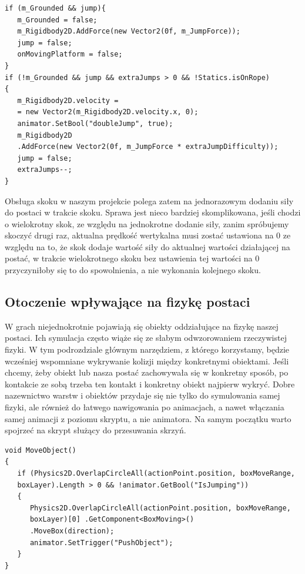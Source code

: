 \documentclass[oneside,polski,logo]{amuthesis}
\begin{document}
\begin{lstlisting}[breaklines=true,
language={[Sharp]C},
rulecolor=\color{blue!80!black},
caption={Fragment klasy \texttt{CharacterController.cs}}
]
if (m_Grounded && jump){
   m_Grounded = false;
   m_Rigidbody2D.AddForce(new Vector2(0f, m_JumpForce));
   jump = false;
   onMovingPlatform = false;
}
if (!m_Grounded && jump && extraJumps > 0 && !Statics.isOnRope)
{
   m_Rigidbody2D.velocity =
   = new Vector2(m_Rigidbody2D.velocity.x, 0);
   animator.SetBool("doubleJump", true);
   m_Rigidbody2D
   .AddForce(new Vector2(0f, m_JumpForce * extraJumpDifficulty));
   jump = false;
   extraJumps--;
}
\end{lstlisting}
\newpage
Obsługa skoku w naszym projekcie polega zatem na jednorazowym dodaniu siły do postaci w trakcie skoku. Sprawa jest nieco bardziej skomplikowana, jeśli chodzi o wielokrotny skok, ze względu na jednokrotne dodanie siły, zanim spróbujemy skoczyć drugi raz, aktualna prędkość wertykalna musi zostać ustawiona na 0 ze względu na to, że skok dodaje wartość siły do aktualnej wartości działającej na postać, w trakcie wielokrotnego skoku bez ustawienia tej wartości na 0 przyczyniłoby się to do spowolnienia, a nie wykonania kolejnego skoku.

\subsection{Otoczenie wpływające na fizykę postaci}
W grach niejednokrotnie pojawiają się obiekty oddziałujące na fizykę naszej postaci. Ich symulacja często wiąże się ze słabym odwzorowaniem rzeczywistej fizyki. W tym podrozdziale głównym narzędziem, z którego korzystamy, będzie wcześniej wspomniane wykrywanie kolizji między konkretnymi obiektami. Jeśli chcemy, żeby obiekt lub nasza postać zachowywała się w konkretny sposób, po kontakcie ze sobą trzeba ten kontakt i konkretny obiekt najpierw wykryć. Dobre nazewnictwo warstw i obiektów przydaje się nie tylko do symulowania samej fizyki, ale również do łatwego nawigowania po animacjach, a nawet włączania samej animacji z poziomu skryptu, a nie animatora. Na samym początku warto spojrzeć na skrypt służący do przesuwania skrzyń.


\begin{lstlisting}[breaklines=true,
language={[Sharp]C},
rulecolor=\color{blue!80!black},
caption={Fragment klasy \texttt{PlayerMovement.cs}}
]
void MoveObject()
{
   if (Physics2D.OverlapCircleAll(actionPoint.position, boxMoveRange, 
   boxLayer).Length > 0 && !animator.GetBool("IsJumping"))
   {
      Physics2D.OverlapCircleAll(actionPoint.position, boxMoveRange,
      boxLayer)[0] .GetComponent<BoxMoving>()
      .MoveBox(direction);
      animator.SetTrigger("PushObject");
   }
}
\end{lstlisting}
\end{document}
